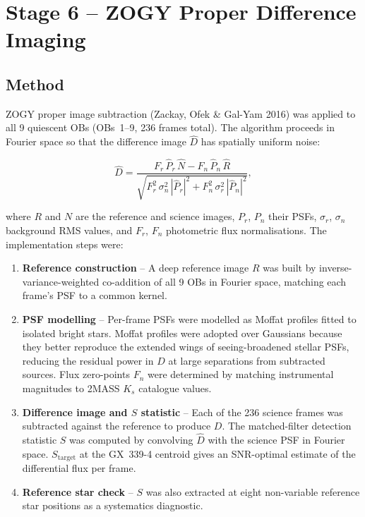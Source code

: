 \documentclass[12pt,a4paper]{article}
\begin{document}
\section{Stage 6 -- ZOGY Proper Difference Imaging}

\subsection{Method}
ZOGY proper image subtraction (Zackay, Ofek \& Gal-Yam 2016) was applied
to all 9 quiescent OBs (OBs~1--9, 236 frames total).  The algorithm
proceeds in Fourier space so that the difference image $\hat{D}$ has
spatially uniform noise:

\begin{equation}
  \hat{D} = \frac{F_r\,\hat{P}_r\,\hat{N} - F_n\,\hat{P}_n\,\hat{R}}
                 {\sqrt{F_r^2\,\sigma_n^2\,|\hat{P}_r|^2 +
                        F_n^2\,\sigma_r^2\,|\hat{P}_n|^2}},
\end{equation}

where $R$ and $N$ are the reference and science images, $P_r$, $P_n$ their
PSFs, $\sigma_r$, $\sigma_n$ background RMS values, and $F_r$, $F_n$
photometric flux normalisations.  The implementation steps were:

\begin{enumerate}
  \item \textbf{Reference construction} -- A deep reference image $R$ was
        built by inverse-variance-weighted co-addition of all 9 OBs in
        Fourier space, matching each frame's PSF to a common kernel.

  \item \textbf{PSF modelling} -- Per-frame PSFs were modelled as Moffat
        profiles fitted to isolated bright stars.  Moffat profiles were
        adopted over Gaussians because they better reproduce the extended
        wings of seeing-broadened stellar PSFs, reducing the residual
        power in $D$ at large separations from subtracted sources.
        Flux zero-points $F_n$ were determined by matching instrumental
        magnitudes to 2MASS $K_s$ catalogue values.

  \item \textbf{Difference image and $S$ statistic} -- Each of the 236
        science frames was subtracted against the reference to produce $D$.
        The matched-filter detection statistic $S$ was computed by
        convolving $\hat{D}$ with the science PSF in Fourier space.
        $S_\mathrm{target}$ at the GX~339-4 centroid gives an SNR-optimal
        estimate of the differential flux per frame.

  \item \textbf{Reference star check} -- $S$ was also extracted at eight
        non-variable reference star positions as a systematics diagnostic.
\end{enumerate}
\end{document}
